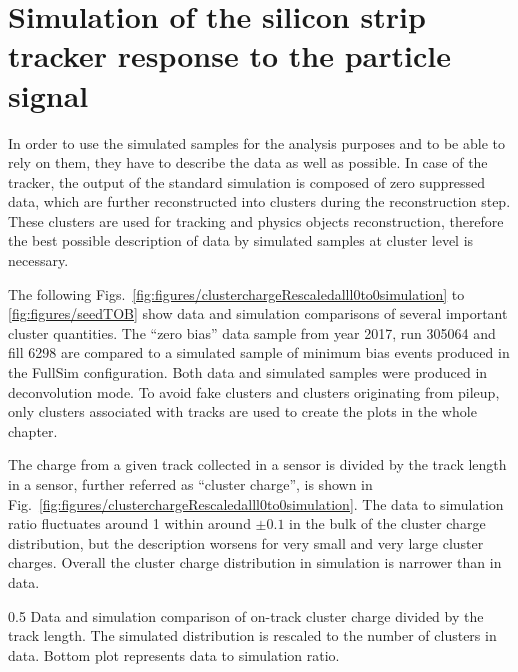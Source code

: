 \newpage

\section{Simulation of the silicon strip tracker response to the particle signal~\label{sec:trackerSimu}}

In order to use the simulated samples for the analysis purposes and to be able to rely on them, they have to describe the data as well as possible. In case of the tracker, the output of the standard simulation is composed of zero suppressed data, which are further reconstructed into clusters during the reconstruction step. These clusters are used for tracking and physics objects reconstruction, therefore the best possible description of data by simulated samples at cluster level is necessary.

The following Figs.~\ref{fig:figures/clusterchargeRescaledalll0to0simulation} to \ref{fig:figures/seedTOB} show data and simulation comparisons of several important cluster quantities. The ``zero bias'' data sample from year 2017, run 305064 and fill 6298 are compared to a simulated sample of minimum bias events produced in the FullSim configuration. Both data and simulated samples were produced in deconvolution mode. To avoid fake clusters and clusters originating from pileup, only clusters associated with tracks are used to create the plots in the whole chapter.
 
The charge from a given track collected in a sensor is divided by the track length in a sensor, further referred as ``cluster charge'', is shown in Fig.~\ref{fig:figures/clusterchargeRescaledalll0to0simulation}. The data to simulation ratio fluctuates around 1 within around $\pm 0.1$ in the bulk of the cluster charge distribution, but the description worsens for very small and very large cluster charges. Overall the cluster charge distribution in simulation is narrower than in data. 


                 {0.5}       %
                 { Data and simulation comparison of on-track cluster charge divided by the track length. The simulated distribution is rescaled to the number of clusters in data. Bottom plot represents data to simulation ratio. }

